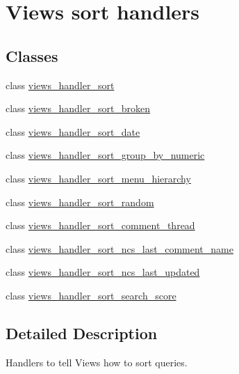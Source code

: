 \hypertarget{group__views__sort__handlers}{
\section{Views sort handlers}
\label{group__views__sort__handlers}
}
\subsection*{Classes}
\begin{DoxyCompactItemize}
\item 
class \hyperlink{classviews__handler__sort}{views\_\-handler\_\-sort}
\item 
class \hyperlink{classviews__handler__sort__broken}{views\_\-handler\_\-sort\_\-broken}
\item 
class \hyperlink{classviews__handler__sort__date}{views\_\-handler\_\-sort\_\-date}
\item 
class \hyperlink{classviews__handler__sort__group__by__numeric}{views\_\-handler\_\-sort\_\-group\_\-by\_\-numeric}
\item 
class \hyperlink{classviews__handler__sort__menu__hierarchy}{views\_\-handler\_\-sort\_\-menu\_\-hierarchy}
\item 
class \hyperlink{classviews__handler__sort__random}{views\_\-handler\_\-sort\_\-random}
\item 
class \hyperlink{classviews__handler__sort__comment__thread}{views\_\-handler\_\-sort\_\-comment\_\-thread}
\item 
class \hyperlink{classviews__handler__sort__ncs__last__comment__name}{views\_\-handler\_\-sort\_\-ncs\_\-last\_\-comment\_\-name}
\item 
class \hyperlink{classviews__handler__sort__ncs__last__updated}{views\_\-handler\_\-sort\_\-ncs\_\-last\_\-updated}
\item 
class \hyperlink{classviews__handler__sort__search__score}{views\_\-handler\_\-sort\_\-search\_\-score}
\end{DoxyCompactItemize}


\subsection{Detailed Description}
Handlers to tell Views how to sort queries. 